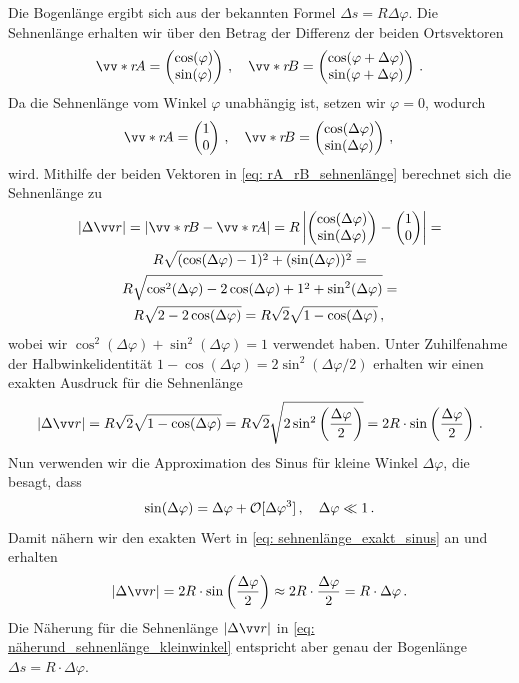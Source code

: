 Die Bogenlänge ergibt sich aus der bekannten Formel $\Delta s = R \Delta \varphi$. Die Sehnenlänge erhalten wir über den Betrag der Differenz der beiden Ortsvektoren 
\begin{equation*}
    \ivecS{r}{A} = \icolTwo{\cos(\varphi)}{\sin(\varphi)} \mComma \quad \ivecS{r}{B} = \icolTwo{\cos(\varphi +\Delta \varphi)}{\sin(\varphi +\Delta \varphi)}\mDot
\end{equation*} 
Da die Sehnenlänge vom Winkel $\varphi$ unabhängig ist, setzen wir \oBdA $\varphi = 0$, wodurch 
\begin{equation}\label{eq: rA_rB_sehnenlänge}
    \ivecS{r}{A} = \icolTwo{1}{0} \mComma \quad \ivecS{r}{B} = \icolTwo{\cos(\Delta \varphi)}{\sin(\Delta \varphi)}\mComma
\end{equation} 
wird. Mithilfe der beiden Vektoren in \cref{eq: rA_rB_sehnenlänge} berechnet sich die Sehnenlänge zu 
\begin{multline}
    |\Delta \ivec{r}| = |\ivecS{r}{B}-\ivecS{r}{A}| = R\left|\icolTwo{\cos(\Delta \varphi)}{\sin(\Delta \varphi)} - \icolTwo{1}{0}\right| = \\
    R\sqrt{(\cos(\Delta \varphi)-1)^2 + (\sin(\Delta \varphi))^2} = \\
    R\sqrt{\cos^2(\Delta \varphi) - 2\cos(\Delta \varphi) + 1^2 + \sin^2(\Delta \varphi)} = \\
    R\sqrt{2-2 \cos(\Delta \varphi)} = R\sqrt{2}\sqrt{1-\cos(\Delta \varphi)} \mComma
\end{multline}
wobei wir $\cos^2(\Delta \varphi) + \sin^2(\Delta \varphi) = 1$ verwendet haben. Unter Zuhilfenahme der Halbwinkelidentität $1-\cos(\Delta \varphi) = 2\sin^2(\Delta \varphi/2)$ erhalten wir einen exakten Ausdruck für die Sehnenlänge
\begin{equation}\label{eq: sehnenlänge_exakt_sinus}
    |\Delta \ivec{r}| = R\sqrt{2}\sqrt{1-\cos(\Delta \varphi)} = R \sqrt{2}\sqrt{2\sin^2\left( \frac{\Delta\varphi}{2} \right)} = 2R\cdot \sin\left( \frac{\Delta \varphi}{2} \right)  \mDot
\end{equation}
Nun verwenden wir die Approximation des Sinus für kleine Winkel $\Delta \varphi$, die besagt, dass 
\begin{equation}
    \sin(\Delta \varphi) = \Delta \varphi + \mathcal{O}[\Delta \varphi^3] \,{,}\, \quad \Delta \varphi \ll 1\,.
\end{equation}
Damit nähern wir den exakten Wert in \cref{eq: sehnenlänge_exakt_sinus} an und erhalten 
\begin{equation} \label{eq: näherund_sehnenlänge_kleinwinkel}
    |\Delta \ivec{r}| = 2R\cdot \sin\left( \frac{\Delta \varphi}{2} \right) \approx 2R \cdot \frac{\Delta \varphi}{2} = R \cdot \Delta\varphi \mDot
\end{equation}
Die Näherung für die Sehnenlänge $|\Delta \ivec{r}|$ in \cref{eq: näherund_sehnenlänge_kleinwinkel} entspricht aber genau der Bogenlänge $\Delta s = R\cdot \Delta\varphi$. \\

